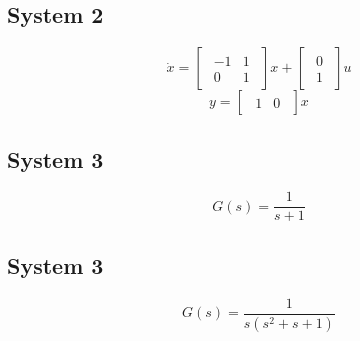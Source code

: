 \documentclass{article}
\begin{document}
    \subsection{System 2}
    $$
        \dot{x}
        =
        \begin{bmatrix}
        \begin{array}{rr}
            -1 & 1\\
            0 & 1
        \end{array}                
        \end{bmatrix}
        x
        +
        \begin{bmatrix}
        \begin{array}{c}
            0\\
            1
        \end{array}                
        \end{bmatrix}
        u
    $$
    $$
        y
        =
        \begin{bmatrix}
        \begin{array}{cc}
            1 & 0
        \end{array}                
        \end{bmatrix}
        x
    $$

    \subsection{System 3}
    $$
        G(s) = \frac{1}{s+1}
    $$

    \subsection{System 3}
    $$
        G(s) = \frac{1}{s(s^2+s+1)}
    $$
   
\end{document}
